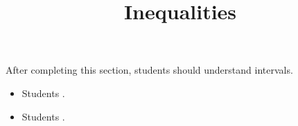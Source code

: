 \documentclass{ximera}
\title{Inequalities}
\begin{document}
\begin{abstract}
\end{abstract}

\maketitle

\begin{sectionOutcomes}

After completing this section, students should understand intervals. 

\begin{itemize}
\item Students .
\item Students .
\end{itemize}

\end{sectionOutcomes}
\end{document}
